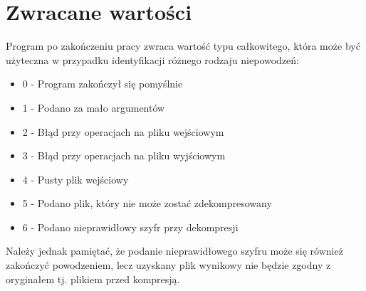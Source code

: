 \documentclass[]{article}
\begin{document}
\section{Zwracane wartości}\label{header-n281}

Program po zakończeniu pracy zwraca wartość typu całkowitego, która może być użyteczna w przypadku identyfikacji różnego rodzaju niepowodzeń:

\begin{itemize}
\item
0 - Program zakończył się pomyślnie
\item
1 - Podano za mało argumentów
\item
2 - Błąd przy operacjach na pliku wejściowym
\item
3 - Błąd przy operacjach na pliku wyjściowym
\item
4 - Pusty plik wejściowy
\item
5 - Podano plik, który nie może zostać zdekompresowany
\item
6 - Podano nieprawidłowy szyfr przy dekompresji
\end{itemize}
Należy jednak pamiętać, że podanie nieprawidłowego szyfru może się również zakończyć powodzeniem, lecz uzyskany plik wynikowy nie będzie zgodny z oryginałem tj. plikiem przed kompresją.
\end{document}
